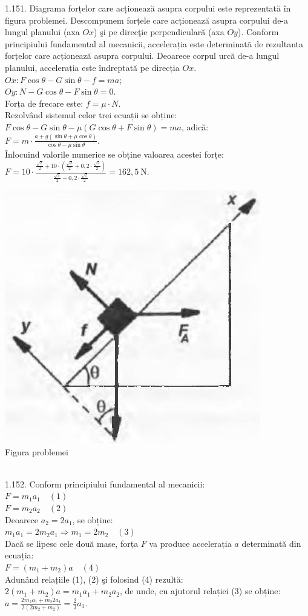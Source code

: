 1.151. Diagrama forțelor care acționează asupra corpului este reprezentată în figura problemei. Descompunem forțele care acționează asupra corpului de-a lungul planului (axa $Ox$) şi pe direcţie perpendiculară (axa $Oy$). Conform principiului fundamental al mecanicii, accelerația este determinatã de rezultanta forțelor care acționează asupra corpului. Deoarece corpul urcă de-a lungul planului, accelerația este îndreptată pe direcția $Ox$.\\ $Ox: F \cos \theta-G \sin \theta-f=m a$;\\ $Oy: N-G \cos \theta-F \sin \theta=0$.\\ Forța de frecare este: $f=\mu \cdot N$.\\ Rezolvând sistemul celor trei ecuații se obține:\\ $F \cos \theta-G \sin \theta-\mu(G \cos \theta+F \sin \theta)=m a$, adică:\\ $F=m \cdot \frac{a+g(\sin \theta+\mu \cos \theta)}{\cos \theta-\mu \sin \theta}$.\\ Înlocuind valorile numerice se obține valoarea acestei forțe:\\ $F=10 \cdot \frac{\frac{\sqrt{2}}{2}+10 \cdot\left(\frac{\sqrt{2}}{2}+0,2 \cdot \frac{\sqrt{2}}{2}\right)}{\frac{\sqrt{2}}{2}-0,2 \cdot \frac{\sqrt{2}}{2}}=162,5 \mathrm{~N}$.\\ \begin{center} \includegraphics[width=0.4\linewidth]{images/2025_07_01_5b3ff9fa0d508c8e9f17g-231}\\ Figura problemei \end{center}\\

1.152. Conform principiului fundamental al mecanicii:\\ $F=m_{1} a_{1} \quad (1)$\\ $F=m_{2} a_{2} \quad (2)$\\ Deoarece $a_{2}=2 a_{1}$, se obține:\\ $m_{1} a_{1}=2 m_{2} a_{1} \Rightarrow m_{1}=2 m_{2} \quad (3)$\\ Dacă se lipesc cele două mase, forța $F$ va produce accelerația $a$ determinată din ecuația:\\ $F=\left(m_{1}+m_{2}\right) a \quad (4)$\\ Adunând relațiile (1), (2) şi folosind (4) rezultă:\\ $2\left(m_{1}+m_{2}\right) a=m_{1} a_{1}+m_{2} a_{2}$, de unde, cu ajutorul relației (3) se obține:\\ $a=\frac{2 m_{2} a_{1}+m_{2} 2 a_{1}}{2\left(2 m_{2}+m_{2}\right)}=\frac{2}{3} a_{1}$.\\

